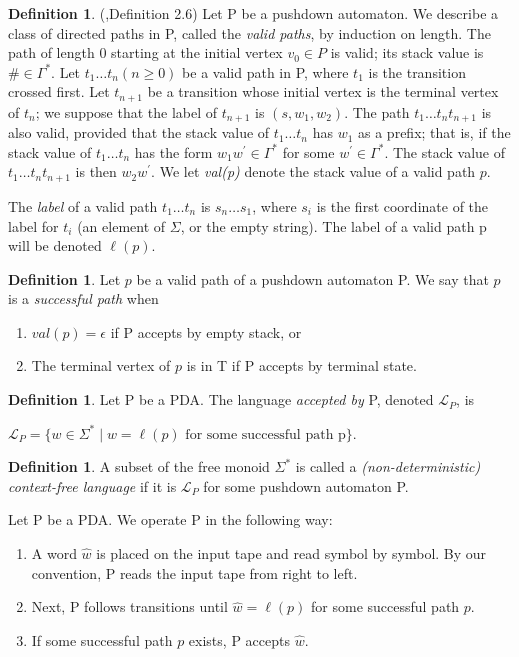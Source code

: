 \documentclass[11pt]{amsart}
\theoremstyle{plain}
\theoremstyle{remark}
\theoremstyle{definition}
\newtheorem{definition}[theorem]{Definition}
\theoremstyle{remark}
\theoremstyle{named}
\begin{document}
\begin{definition}(\cite{Farley},Definition 2.6)
Let P be a pushdown automaton. 
We describe a class of directed paths in P, called the \emph{valid paths}, by induction on length. 
The path of length 0 starting at the initial vertex $v_0 \in P$ is valid; 
its stack value is $\# \in \Gamma^*$. 
Let $t_1 \dots t_n (n \geq 0)$ be a valid path in P, where $t_1$ is the transition crossed first. 
Let $t_{n+1}$ be a transition whose initial vertex is the terminal vertex of $t_n$; 
we suppose that the label of $t_{n+1}$ is $(s,w_1,w_2)$. The path $t_1 \dots t_n t_{n+1}$ is also valid, provided that the stack value of $t_1 \dots t_n$ has $w_1$ as a prefix; 
that is, if the stack value of $t_1 \dots t_n$ has the form $w_1 w^{\prime} \in \Gamma^*$ for some $w^{\prime} \in \Gamma^*$. 
The stack value of $t_1 \dots t_n t_{n+1}$ is then $w_2 w^{\prime}$. We let \emph{val(p)} denote the stack value of a valid path $p$.

The \emph{label} of a valid path $t_1 \dots t_n$ is $s_n \dots s_1$, where $s_i$ is the first coordinate of the label for $t_i$ (an element of $\Sigma$, or the empty string). The label of a valid path p will be denoted $\ell(p)$.
\end{definition}
\begin{definition}\label{def:success}
Let $p$ be a valid path of a pushdown automaton P. We say that $p$ is a \emph{successful path} when
\begin{enumerate}
\item $val(p) = \epsilon$ if P accepts by empty stack, or
\item The terminal vertex of $p$ is in T if P accepts by terminal state. 
\end{enumerate}
\end{definition}
\begin{definition}\label{def:accept}
Let P be a PDA. The language \emph{accepted by} P, denoted $\mathcal{L}_P$, is
\item $\mathcal{L}_P = \{w \in \Sigma ^* \mid w = \ell(p) \text{ for some successful path p}\}$.
\end{definition}
\begin{definition}
A subset of the free monoid $\Sigma ^*$ is called a \emph{(non-deterministic) context-free language} if it is $\mathcal{L}_P$ for some pushdown automaton P.
\end{definition}
\noindent Let P be a PDA. We operate P in the following way:
\begin{enumerate}
\item A word $\hat{w}$ is placed on the input tape and read symbol by symbol. By our convention, P reads the input tape from right to left.
\item Next, P follows transitions until $\hat{w} = \ell(p)$ for some successful path $p$. 
\item If some successful path $p$ exists, P accepts $\hat{w}$.
\end{enumerate}
\end{document}
